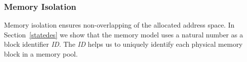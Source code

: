 %


\subsubsection{Memory Isolation}
Memory isolation ensures non-overlapping of the allocated address space. In Section~\ref{statedes} we show that the memory model uses a natural number as a block identifier \emph{ID}. The \emph{ID} helps us to uniquely identify each physical memory block in a memory pool.


